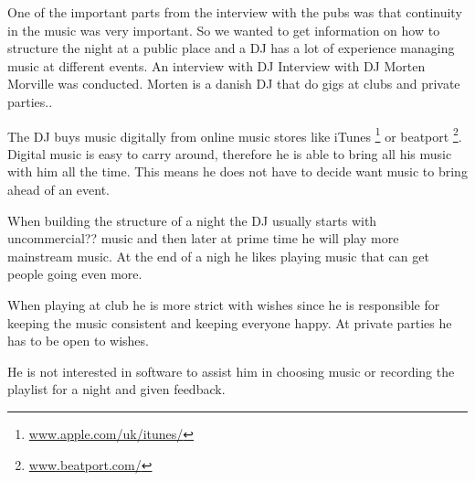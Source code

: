 One of the important parts from the interview with the pubs was that continuity in the music was very important. So we wanted to get information on how to structure the night at a public place and  a DJ has a lot of experience managing music at different events. An interview with DJ 
Interview with DJ Morten Morville was conducted. Morten is a danish DJ that do gigs at clubs and private parties.\cite{et eller andet med interview}.


The DJ buys music digitally from online music stores like iTunes \footnote{\url{www.apple.com/uk/itunes/}} or beatport \footnote{\url{www.beatport.com/}}. Digital music is easy to carry around, therefore he is able to bring all his music with him all the time. This means he does not have to decide want music to bring ahead of an event. 

When building the structure of a night the DJ usually starts with uncommercial?? music and then later at prime time he will play more mainstream music. At the end of a nigh he likes playing music that can get people going even more.

When playing at club he is more strict with wishes since he is responsible for keeping the music consistent and keeping everyone happy. At private parties he has to be open to wishes.

He is not interested in software to assist him in choosing music or recording the playlist for a night and given feedback.

